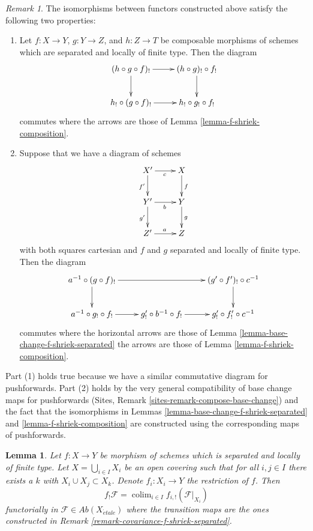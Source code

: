\documentclass{stacks-project}
\theoremstyle{plain}
\newtheorem{lemma}[subsection]{Lemma}
\theoremstyle{definition}
\theoremstyle{remark}
\newtheorem{remark}[subsection]{Remark}
\numberwithin{equation}{subsection}
\def\colim{\mathop{\mathrm{colim}}\nolimits}
\def\etale{{\acute{e}tale}}
\begin{document}
\begin{remark}
\label{remark-f-shriek-base-change-composition}
The isomorphisms between functors
constructed above satisfy the following two properties:
\begin{enumerate}
\item Let $f : X \to Y$, $g : Y \to Z$, and $h : Z \to T$ be composable
morphisms of schemes which are separated and locally of finite type.
Then the diagram
$$
\xymatrix{
(h \circ g \circ f)_! \ar[r] \ar[d] &
(h \circ g)_! \circ f_! \ar[d] \\
h_! \circ (g \circ f)_! \ar[r] &
h_! \circ g_! \circ f_!
}
$$
commutes where the arrows are those of Lemma \ref{lemma-f-shriek-composition}.
\item Suppose that we have a diagram of schemes
$$
\xymatrix{
X' \ar[d]_{f'} \ar[r]_c & X \ar[d]^f \\
Y' \ar[d]_{g'} \ar[r]_b & Y \ar[d]^g \\
Z' \ar[r]^a & Z
}
$$
with both squares cartesian and $f$ and $g$ separated and
locally of finite type. Then the diagram
$$
\xymatrix{
a^{-1} \circ (g \circ f)_! \ar[d] \ar[rr] & &
(g' \circ f')_! \circ c^{-1} \ar[d] \\
a^{-1} \circ g_! \circ f_! \ar[r] &
g'_! \circ b^{-1} \circ f_! \ar[r] &
g'_! \circ f'_! \circ c^{-1}
}
$$
commutes where the horizontal arrows are those of
Lemma \ref{lemma-base-change-f-shriek-separated}
the arrows are those of Lemma \ref{lemma-f-shriek-composition}.
\end{enumerate}
Part (1) holds true because we have a similar commutative
diagram for pushforwards. Part (2) holds by the very general
compatibility of base change maps for pushforwards
(Sites, Remark \ref{sites-remark-compose-base-change})
and the fact that the isomorphisms in
Lemmas \ref{lemma-base-change-f-shriek-separated} and
\ref{lemma-f-shriek-composition}
are constructed using the corresponding maps of pushforwards.
\end{remark}

\begin{lemma}
\label{lemma-colim-f-shriek-separated}
Let $f : X \to Y$ be morphism of schemes which is separated and
locally of finite type. Let $X = \bigcup_{i \in I} X_i$ be an
open covering such that for all $i, j \in I$ there exists a $k$
with $X_i \cup X_j \subset X_k$. Denote $f_i : X_i \to Y$
the restriction of $f$. Then
$$
f_!\mathcal{F} = \colim_{i \in I} f_{i, !}(\mathcal{F}|_{X_i})
$$
functorially in $\mathcal{F} \in \textit{Ab}(X_\etale)$
where the transition maps are the ones constructed in
Remark \ref{remark-covariance-f-shriek-separated}.
\end{lemma}
\end{document}
